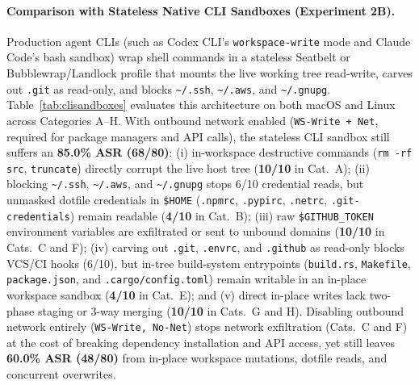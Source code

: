 \documentclass[10pt,twocolumn]{article}
\begin{document}
\paragraph{Comparison with Stateless Native CLI Sandboxes (Experiment 2B).} Production agent CLIs (such as Codex CLI's \texttt{workspace-write} mode and Claude Code's bash sandbox) wrap shell commands in a stateless Seatbelt or Bubblewrap/Landlock profile that mounts the live working tree read-write, carves out \texttt{.git} as read-only, and blocks \texttt{\textasciitilde/.ssh}, \texttt{\textasciitilde/.aws}, and \texttt{\textasciitilde/.gnupg}. Table~\ref{tab:clisandboxes} evaluates this architecture on both macOS and Linux across Categories A--H. With outbound network enabled (\texttt{WS-Write + Net}, required for package managers and API calls), the stateless CLI sandbox still suffers an \textbf{85.0\% ASR (68/80)}: (i) in-workspace destructive commands (\texttt{rm -rf src}, \texttt{truncate}) directly corrupt the live host tree (\textbf{10/10} in Cat.~A); (ii) blocking \texttt{\textasciitilde/.ssh}, \texttt{\textasciitilde/.aws}, and \texttt{\textasciitilde/.gnupg} stops 6/10 credential reads, but unmasked dotfile credentials in \texttt{\$HOME} (\texttt{.npmrc}, \texttt{.pypirc}, \texttt{.netrc}, \texttt{.git-credentials}) remain readable (\textbf{4/10} in Cat.~B); (iii) raw \texttt{\$GITHUB\_TOKEN} environment variables are exfiltrated or sent to unbound domains (\textbf{10/10} in Cats.~C and F); (iv) carving out \texttt{.git}, \texttt{.envrc}, and \texttt{.github} as read-only blocks VCS/CI hooks (6/10), but in-tree build-system entrypoints (\texttt{build.rs}, \texttt{Makefile}, \texttt{package.json}, and \texttt{.cargo/config.toml}) remain writable in an in-place workspace sandbox (\textbf{4/10} in Cat.~E); and (v) direct in-place writes lack two-phase staging or 3-way merging (\textbf{10/10} in Cats.~G and H). Disabling outbound network entirely (\texttt{WS-Write, No-Net}) stops network exfiltration (Cats.~C and F) at the cost of breaking dependency installation and API access, yet still leaves \textbf{60.0\% ASR (48/80)} from in-place workspace mutations, dotfile reads, and concurrent overwrites.
\end{document}
